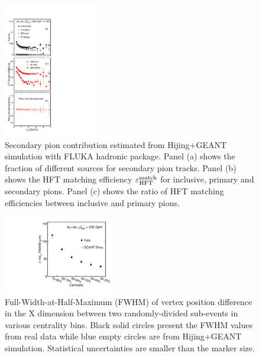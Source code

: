 \documentclass[%
 reprint,	
showpacs,
 amsmath,amssymb,
 aps,
 prc,
]{revtex4-1}
\providecommand{\DIFaddbeginFL}{} %
\providecommand{\DIFaddendFL}{} %
\providecommand{\DIFdelbeginFL}{} %
\providecommand{\DIFdelendFL}{} %
\begin{document}
\begin{figure}[h]
\centering
\DIFdelbeginFL %
\DIFdelendFL \DIFaddbeginFL \includegraphics[width=0.37\textwidth, angle = 0]{fig/Fraction_Pion_2.pdf}
  \DIFaddendFL \caption{Secondary pion contribution estimated from Hijing+GEANT simulation with FLUKA hadronic package. Panel (a) shows the fraction of different sources for secondary pion tracks. Panel (b) shows the HFT matching efficiency $\varepsilon_{\rm HFT}^{\rm match}$ for inclusive, primary and secondary pions. Panel (c) shows the ratio of HFT matching efficiencies between inclusive and primary pions.}
\label{fig:Fraction_Pion} 
\end{figure}

\begin{figure}
\centering
\includegraphics[width=0.43\textwidth]{fig/vtxX_vsCent.pdf}
\caption{Full-Width-at-Half-Maximum (FWHM) of vertex position difference in the X dimension between two randomly-divided sub-events in various centrality bins. Black solid circles present the FWHM values from real data while blue empty circles are from Hijing+GEANT simulation. Statistical uncertainties are smaller than the marker size.}
\label{fig:vtxX_vsCent} 
\end{figure}
\end{document}
